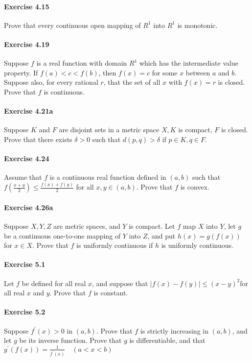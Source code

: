 \documentclass{article}
\begin{document}
\paragraph{Exercise 4.15} Prove that every continuous open mapping of $R^{1}$ into $R^{1}$ is monotonic.

\paragraph{Exercise 4.19} Suppose $f$ is a real function with domain $R^{1}$ which has the intermediate value property. If $f(a)<c<f(b)$, then $f(x)=c$ for some $x$ between $a$ and $b$. Suppose also, for every rational $r$, that the set of all $x$ with $f(x)=r$ is closed. Prove that $f$ is continuous.

\paragraph{Exercise 4.21a} Suppose $K$ and $F$ are disjoint sets in a metric space $X, K$ is compact, $F$ is closed. Prove that there exists $\delta>0$ such that $d(p, q)>\delta$ if $p \in K, q \in F$.

\paragraph{Exercise 4.24} Assume that $f$ is a continuous real function defined in $(a, b)$ such that $f\left(\frac{x+y}{2}\right) \leq \frac{f(x)+f(y)}{2}$ for all $x, y \in(a, b)$. Prove that $f$ is convex.

\paragraph{Exercise 4.26a} Suppose $X, Y, Z$ are metric spaces, and $Y$ is compact. Let $f$ map $X$ into $Y$, let $g$ be a continuous one-to-one mapping of $Y$ into $Z$, and put $h(x)=g(f(x))$ for $x \in X$. Prove that $f$ is uniformly continuous if $h$ is uniformly continuous.

\paragraph{Exercise 5.1} Let $f$ be defined for all real $x$, and suppose that $|f(x)-f(y)| \leq(x-y)^{2}$for all real $x$ and $y$. Prove that $f$ is constant.

\paragraph{Exercise 5.2} Suppose $f^{\prime}(x)>0$ in $(a, b)$. Prove that $f$ is strictly increasing in $(a, b)$, and let $g$ be its inverse function. Prove that $g$ is differentiable, and that$g^{\prime}(f(x))=\frac{1}{f^{\prime}(x)} \quad(a<x<b)$
\end{document}
